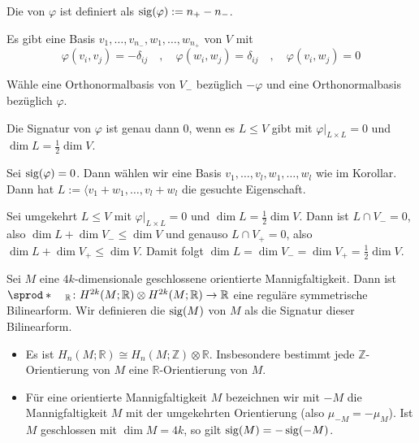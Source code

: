\begin{definition}[{name=[Signatur]}]
	Die  von $\varphi$ ist definiert als $\operatorname{sig}(\varphi) := n_+ - n_-$. 
\end{definition}

\begin{korollar}
	Es gibt eine Basis $v_1, \ldots , v_{n_-}, w_1 , \ldots , w_{n_+}$ von $V$ mit 
	\[
		\varphi(v_i,v_j) = - \delta_{ij} \quad , \quad \varphi(w_i,w_j) =\delta_{ij} \quad , \quad \varphi(v_i,w_j)=0
	\]
\end{korollar}
\begin{beweis}
	Wähle eine Orthonormalbasis von $V_-$ bezüglich $-\varphi$ und eine Orthonormalbasis bezüglich $\varphi$.
\end{beweis}

\begin{lemma}[label=sig_null]
	Die Signatur von $\varphi$ ist genau dann $0$, wenn es $L \le V$ gibt mit $\varphi|_{L \times L}=0$ und $\dim L = \frac{1}{2} \dim V$.
\end{lemma}
\begin{beweis}
	Sei $\operatorname{sig}(\varphi)=0$. Dann wählen wir eine Basis $v_1,\ldots ,v_l,w_1,\ldots ,w_l$ wie im Korollar.
	Dann hat $L := \langle v_1+ w_1, \ldots ,v_l+w_l$ die gesuchte Eigenschaft.
	
	Sei umgekehrt $L \le V$ mit $\varphi|_{L \times L}=0$ und $\dim L = \frac{1}{2} \dim V$.
	Dann ist $L \cap V_- =0$, also $\dim L + \dim V_- \le \dim V$ und genauso $L \cap V_+ =0$, also $\dim L + \dim V_+ \le \dim V$.
	Damit folgt $\dim L = \dim V_- = \dim V_+ = \frac{1}{2} \dim V$.
\end{beweis}

\begin{definition}[{name=[Signatur]}]
	Sei $M$ eine $4k$-dimensionale geschlossene orientierte Mannigfaltigkeit.
	Dann ist $\sprod*{\enspace}{\enspace}_\mathbb{R} \colon H^{2k}(M;\mathbb{R}) \otimes H^{2k}(M;\mathbb{R}) \to \mathbb{R}$ eine reguläre symmetrische Bilinearform.
	Wir definieren die  $\operatorname{sig}(M)$ von $M$ als die Signatur dieser Bilinearform.
\end{definition}

\begin{bemerkung}
	\leavevmode
	\begin{itemize}
		\item Es ist $H_n(M;\mathbb{R}) \cong H_n(M;\mathbb{Z})\otimes \mathbb{R}$.
	Insbesondere bestimmt jede $\mathbb{Z}$-Orientierung von $M$ eine $\mathbb{R}$-Orientierung von $M$.
	\item Für eine orientierte Mannigfaltigkeit $M$ bezeichnen wir mit $-M$ die Mannigfaltigkeit $M$ mit der umgekehrten Orientierung (also $\mu_{-M}=-\mu_M$).
	Ist $M$ geschlossen mit $\dim M = 4k$, so gilt $\operatorname{sig}(M)=- \operatorname{sig}(-M)$.
	\end{itemize}
\end{bemerkung}

